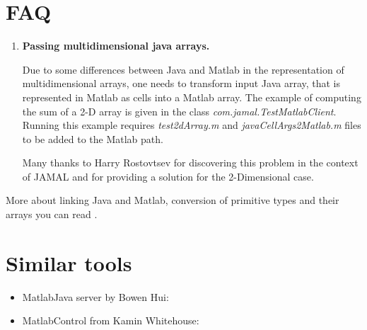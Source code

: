 \documentclass[a4paper,twoside,12pt]{report}
\begin{document}
\section{FAQ}\label{faq}

\begin{enumerate}
	\item   \textbf{Passing multidimensional java arrays. }
	
	Due to some differences between Java and Matlab in the representation of multidimensional arrays, one needs to transform input Java array, that is represented in Matlab as cells into a Matlab array. The example of computing the sum of a 2-D array is given in the class \textit{com.\-jamal.\-TestMatlabClient}. Running this example requires \textit{test2dArray.m} and \textit{javaCellArgs2Matlab.m} files to be added to the Matlab path. 
	
	Many thanks to Harry Rostovtsev for discovering this problem in the context of JAMAL and for providing a solution for the 2-Dimensional case.  
	
\end{enumerate}



More about linking Java and Matlab,  conversion of primitive types and their arrays you can read 
.


\section{Similar tools}\label{similarTools}

\begin{itemize}
	\item MatlabJava server by Bowen Hui:

 
 \item MatlabControl from Kamin Whitehouse:


\end{itemize}

\end{document}
